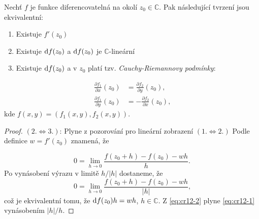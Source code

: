 
\begin{theorem}\label{CR}
Nechť $f$ je funkce diferencovatelná na okolí $z_0 \in \mathbb{C}$. Pak následující tvrzení jsou ekvivalentní:
\begin{enumerate}
    \item Existuje $f'(z_0)$ %
    \item Existuje $\mathop{}\!\mathrm{d} f(z_0)$ a $\mathop{}\!\mathrm{d} f(z_0)$ je $ \mathbb{C}$-lineární %
    \item Existuje $\mathop{}\!\mathrm{d} f(z_0)$ a v $z_0$ platí tzv. \emph{Cauchy-Riemannovy podmínky}: %
\end{enumerate}
\begin{align*}
\tag{CR}
\label{eqn:CR}
\frac{\partial f_1}{\partial x}(z_0) &= \frac{\partial f_2}{\partial y}(z_0)\text{, }\\
\frac{\partial f_1}{\partial y}(z_0) &= -\frac{\partial f_2}{\partial x}(z_0)\text{,}    
\end{align*}
kde $f(x,y) = (f_1(x,y),f_2(x,y))$.

\end{theorem}
\begin{proof}
$(2. \iff 3.)$: Plyne z pozorování pro lineární zobrazení %
\newline
$(1. \iff 2.)$ Podle definice $w = f'(z_0)$ znamená, že 

\begin{equation}\label{eq:cr12-1} 
0 = \lim_{h \to 0} {\frac{f(z_0+h)-f(z_0)-wh}{h}}\text{.} 
\end{equation}
Po vynásobení výrazu v limitě $h/|h|$ dostaneme, že
\begin{equation}\label{eq:cr12-2}
0 = \lim_{h \to 0} \frac{f(z_0+h)-f(z_0)-wh}{|h|}\text{,}
\end{equation}%
což je ekvivalentní tomu, že  $\mathop{}\!\mathrm{d} f(z_0)h=wh$, $h\in \mathbb{C}$. Z \cref{eq:cr12-2} plyne \cref{eq:cr12-1} vynásobením $|h|/h$.
\end{proof}

